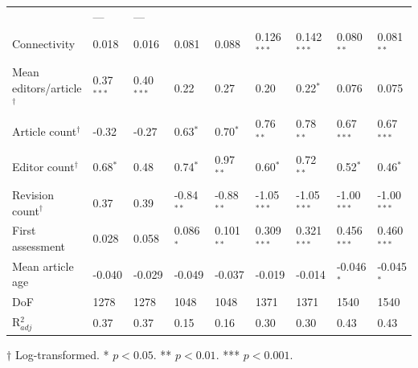 \documentclass[10pt,twocolumn]{article}
\newcommand{\+}{\phantom{-}}
\begin{document}
\begin{table}
\begin{tabular}{lllllllll}
                               &  \+ ---         & \+ --- \\
Connectivity                   & \+0.018         & \+0.016        
                               & \+0.081         & \+0.088
                               & \+0.126$^{***}$ & \+0.142$^{***}$
                               & \+0.080$^{**}$  & \+0.081$^{**}$ \\
Mean editors/article$^\dagger$ & \+0.37$^{***}$  & \+0.40$^{***}$ 
                               & \+0.22          & \+0.27
                               & \+0.20          & \+0.22$^{*}$
                               & \+0.076         & \+0.075 \\
Article count$^\dagger$        &  -0.32          & -0.27          
                               & \+0.63${^*}$    & \+0.70${^*}$ 
                               & \+0.76$^{**}$   & \+0.78$^{**}$
                               & \+0.67$^{***}$  & \+0.67$^{***}$ \\
Editor count$^\dagger$         & \+0.68$^{*}$    & \+0.48         
                               & \+0.74$^{*}$    & \+0.97$^{**}$
                               & \+0.60$^{*}$    & \+0.72$^{**}$
                               & \+0.52$^{*}$    & \+0.46$^{*}$ \\
Revision count$^\dagger$       & \+0.37          & \+0.39         
                               &  -0.84$^{**}$   & -0.88$^{**}$
                               &  -1.05$^{***}$  & -1.05$^{***}$
                               &  -1.00$^{***}$  & -1.00$^{***}$ \\
First assessment               & \+0.028         & \+0.058        
                               & \+0.086$^{*}$   & \+0.101$^{**}$
                               & \+0.309$^{***}$ & \+0.321$^{***}$
                               & \+0.456$^{***}$ & \+0.460$^{***}$ \\
Mean article age               &  -0.040         & -0.029         
                               &  -0.049         & -0.037
                               &  -0.019         & -0.014
                               &  -0.046$^{*}$   & -0.045$^{*}$ \\
\hline
DoF                            & 1278            & 1278          
                               & 1048            & 1048
                               & 1371            & 1371
                               & 1540            & 1540 \\
R$^2_{adj}$                    & 0.37            & 0.37          
                               & 0.15            & 0.16
                               & 0.30            & 0.30
                               & 0.43            & 0.43 \\
\hline
\end{tabular}
\begin{tablenotes}
\item $\dagger$ Log-transformed. * $p < 0.05$. ** $p < 0.01$. *** $p < 0.001$.
\end{tablenotes}
\end{table}
\end{document}
